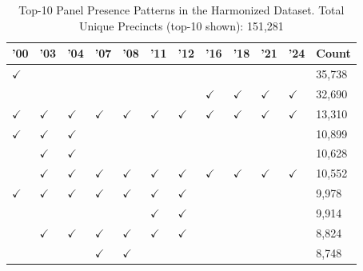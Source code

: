 \begin{table}[ht]
\centering
\begin{tabular}{llllllllllll}
  \hline
'00 & '03 & '04 & '07 & '08 & '11 & '12 & '16 & '18 & '21 & '24 & Count \\ 
  \hline
$\checkmark$ &  &  &  &  &  &  &  &  &  &  & 35,738 \\ 
   &  &  &  &  &  &  & $\checkmark$ & $\checkmark$ & $\checkmark$ & $\checkmark$ & 32,690 \\ 
  $\checkmark$ & $\checkmark$ & $\checkmark$ & $\checkmark$ & $\checkmark$ & $\checkmark$ & $\checkmark$ & $\checkmark$ & $\checkmark$ & $\checkmark$ & $\checkmark$ & 13,310 \\ 
  $\checkmark$ & $\checkmark$ & $\checkmark$ &  &  &  &  &  &  &  &  & 10,899 \\ 
   & $\checkmark$ & $\checkmark$ &  &  &  &  &  &  &  &  & 10,628 \\ 
   & $\checkmark$ & $\checkmark$ & $\checkmark$ & $\checkmark$ & $\checkmark$ & $\checkmark$ & $\checkmark$ & $\checkmark$ & $\checkmark$ & $\checkmark$ & 10,552 \\ 
  $\checkmark$ & $\checkmark$ & $\checkmark$ & $\checkmark$ & $\checkmark$ & $\checkmark$ & $\checkmark$ &  &  &  &  &  9,978 \\ 
   &  &  &  &  & $\checkmark$ & $\checkmark$ &  &  &  &  &  9,914 \\ 
   & $\checkmark$ & $\checkmark$ & $\checkmark$ & $\checkmark$ & $\checkmark$ & $\checkmark$ &  &  &  &  &  8,824 \\ 
   &  &  & $\checkmark$ & $\checkmark$ &  &  &  &  &  &  &  8,748 \\ 
   \hline
\end{tabular}
\caption{Top-10 Panel Presence Patterns in the Harmonized Dataset. Total Unique Precincts (top-10 shown): 151,281} 
\label{tab:patterns}
\end{table}
